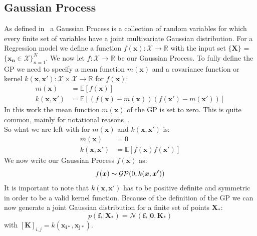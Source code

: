 \documentclass{article}
\begin{document}
\subsection{Gaussian Process} %
As defined in~\cite{RasmussenCarlEdward} a Gaussian Process is a collection of random variables for which every finite set of variables have a joint multivariate Gaussian distribution. For a Regression model we define a function
$f(\bm{x}): \mathcal{X}\rightarrow \mathbb{R}$ with the input set $\{\bm{X}\}$
= $\{\bm{x_n} \in \mathcal{X} \}_{n=1}^N$. We now let $f:
    \mathcal{X}\rightarrow \mathbb{R}$ be our Gaussian Process. To fully define the GP we need to specify a mean function $m(\bm{x})$ and a covariance function or
kernel $k(\bm{x}, \bm{x'}): \mathcal{X} \times \mathcal{X} \rightarrow
    \mathbb{R}$ for $f(\bm{x})$:
\begin{equation}
    \begin{aligned}
        m(\bm{x})         & = \mathbb{E}[f(\bm{x})]                                    \\
        k(\bm{x},\bm{x'}) & = \mathbb{E}[(f(\bm{x})-m(\bm{x}))(f(\bm{x'})-m(\bm{x'}))]
    \end{aligned}
\end{equation}
In this work the mean function $m(\bm{x})$ of the GP is set to zero. This is quite common, mainly for notational reasons~\cite{RasmussenCarlEdward}.\\
So what we are left with for  $m(\bm{x})$ and $ k(\bm{x},\bm{x'})$ is:
\begin{equation}
    \begin{aligned}
        m(\bm{x})         & = 0                               \\
        k(\bm{x},\bm{x'}) & = \mathbb{E}[f(\bm{x})f(\bm{x'})]
    \end{aligned}
\end{equation}
We now write our Gaussian Process $f(\bm{x})$ as:
\begin{equation}
    f(\bm{x})\thicksim \mathcal{G} \mathcal{P}(0,k(\bm{x},\bm{x'}))
\end{equation}
It is important to note that $ k(\bm{x},\bm{x'})$ has to be positive definite and symmetric in order to be a valid kernel function.
Because of the definition of the GP we can now generate a joint Gaussian distribution for a finite set of points $\bm{X_*}$:
\begin{equation}
    \label{eq:f_star_random_vector}
    p(\bm{f_*|\bm{X_*}}) = \mathcal{N}(\bm{f_*}|\bm{0},\bm{K_*})
\end{equation}
with ${[\bm{K}]}_{i,j} = k(\bm{x_{i*}},\bm{x_{j*}})$.
\end{document}
